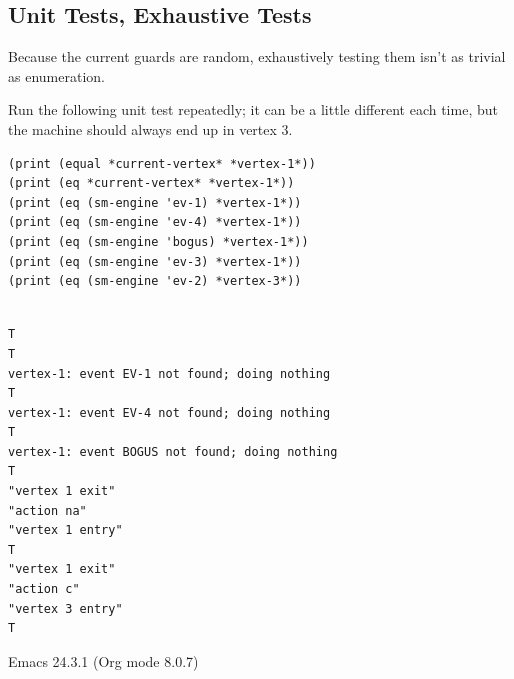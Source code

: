 \documentclass[10pt,oneside,x11names]{article}
\begin{document}
\subsection{Unit Tests, Exhaustive Tests}
\label{sec:org1d8e79e}

Because the current guards are random, exhaustively testing them isn't as
trivial as enumeration.

Run the following unit test repeatedly; it can be a little different each
time, but the machine should always end up in vertex 3.

\begin{verbatim}
(print (equal *current-vertex* *vertex-1*))
(print (eq *current-vertex* *vertex-1*))
(print (eq (sm-engine 'ev-1) *vertex-1*))
(print (eq (sm-engine 'ev-4) *vertex-1*))
(print (eq (sm-engine 'bogus) *vertex-1*))
(print (eq (sm-engine 'ev-3) *vertex-1*))
(print (eq (sm-engine 'ev-2) *vertex-3*))
\end{verbatim}

\begin{verbatim}

T
T
vertex-1: event EV-1 not found; doing nothing
T
vertex-1: event EV-4 not found; doing nothing
T
vertex-1: event BOGUS not found; doing nothing
T
"vertex 1 exit"
"action na"
"vertex 1 entry"
T
"vertex 1 exit"
"action c"
"vertex 3 entry"
T
\end{verbatim}
Emacs 24.3.1 (Org mode 8.0.7)
\end{document}
